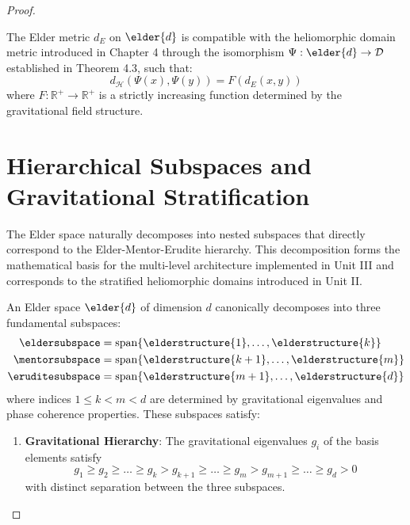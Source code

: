\begin{proof}
\begin{proposition}
The Elder metric $d_E$ on $\elder{d}$ is compatible with the heliomorphic domain metric introduced in Chapter 4 through the isomorphism $\Psi: \elder{d} \rightarrow \mathcal{D}$ established in Theorem 4.3, such that:
\begin{equation}
d_{\mathcal{H}}(\Psi(x), \Psi(y)) = F(d_E(x, y))
\end{equation}
where $F: \mathbb{R}^+ \rightarrow \mathbb{R}^+$ is a strictly increasing function determined by the gravitational field structure.
\end{proposition}

\section{Hierarchical Subspaces and Gravitational Stratification}

The Elder space naturally decomposes into nested subspaces that directly correspond to the Elder-Mentor-Erudite hierarchy. This decomposition forms the mathematical basis for the multi-level architecture implemented in Unit III and corresponds to the stratified heliomorphic domains introduced in Unit II.

\begin{definition}
An Elder space $\elder{d}$ of dimension $d$ canonically decomposes into three fundamental subspaces:
\begin{align}
    \eldersubspace &= \mathrm{span}\{\elderstructure{1}, \ldots, \elderstructure{k}\} \\
    \mentorsubspace &= \mathrm{span}\{\elderstructure{k+1}, \ldots, \elderstructure{m}\} \\
    \eruditesubspace &= \mathrm{span}\{\elderstructure{m+1}, \ldots, \elderstructure{d}\}
\end{align}
where indices $1 \leq k < m < d$ are determined by gravitational eigenvalues and phase coherence properties. These subspaces satisfy:

\begin{enumerate}
    \item \textbf{Gravitational Hierarchy}: The gravitational eigenvalues $g_i$ of the basis elements satisfy
    \begin{equation}
    g_1 \geq g_2 \geq \ldots \geq g_k > g_{k+1} \geq \ldots \geq g_m > g_{m+1} \geq \ldots \geq g_d > 0
    \end{equation}
    with distinct separation between the three subspaces.
    

\end{enumerate}
\end{definition}
\end{proof}
